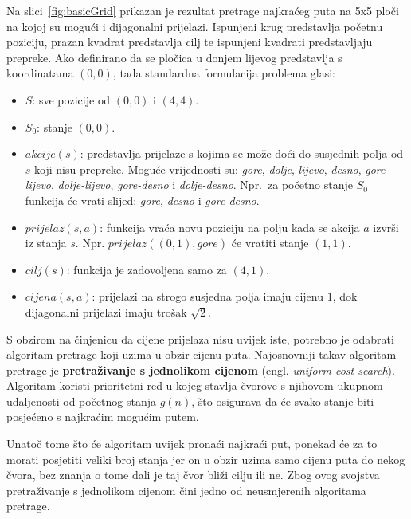 \documentclass[times, utf8, zavrsni, numeric]{fer}
\begin{document}
Na slici~\ref{fig:basicGrid} prikazan je rezultat pretrage najkraćeg puta na 5x5 ploči na kojoj su mogući i dijagonalni prijelazi.
Ispunjeni krug predstavlja početnu poziciju, prazan kvadrat predstavlja cilj te ispunjeni kvadrati predstavljaju prepreke.
Ako definirano da se pločica u donjem lijevog predstavlja s koordinatama \((0, 0)\), tada standardna formulacija problema glasi:
\begin{itemize}
    \item \(S\): sve pozicije od \((0, 0)\) i \((4, 4)\).
    \item \(S_0\): stanje \((0, 0)\).
    \item \(akcije(s)\): predstavlja prijelaze s kojima se može doći do susjednih polja od \(s\) koji nisu prepreke. 
    Moguće vrijednosti su: \textit{gore}, \textit{dolje}, \textit{lijevo}, \textit{desno}, \textit{gore-lijevo}, \textit{dolje-lijevo}, \textit{gore-desno} i \textit{dolje-desno}. 
    Npr.\ za početno stanje \(S_0\) funkcija će vrati slijed: \textit{gore}, \textit{desno} i \textit{gore-desno}. 
    \item \(prijelaz(s, a)\): funkcija vraća novu poziciju na polju kada se akcija \(a\) izvrši iz stanja \(s\). Npr. \(prijelaz((0, 1), gore)\) će vratiti stanje \((1, 1)\).
    \item \(cilj(s)\): funkcija je zadovoljena samo za \((4, 1)\).
    \item \(cijena(s, a)\): prijelazi na strogo susjedna polja imaju cijenu \(1\), dok dijagonalni prijelazi imaju trošak \(\sqrt{2}\).
\end{itemize}

\par S obzirom na činjenicu da cijene prijelaza nisu uvijek iste, potrebno je odabrati algoritam pretrage koji uzima u obzir cijenu puta.
Najosnovniji takav algoritam pretrage je \textbf{pretraživanje s jednolikom cijenom} (engl. \textit{uniform-cost search}). 
Algoritam koristi prioritetni red u kojeg stavlja čvorove s njihovom ukupnom udaljenosti od početnog stanja \(g(n)\), što osigurava da će svako stanje biti posjećeno s najkraćim mogućim putem.

\par Unatoč tome što će algoritam uvijek pronaći najkraći put, ponekad će za to morati posjetiti veliki broj stanja jer on u obzir uzima samo cijenu puta do nekog čvora, bez znanja o tome dali je taj čvor bliži cilju ili ne. 
Zbog ovog svojstva pretraživanje s jednolikom cijenom čini jedno od neusmjerenih algoritama pretrage.
\end{document}
